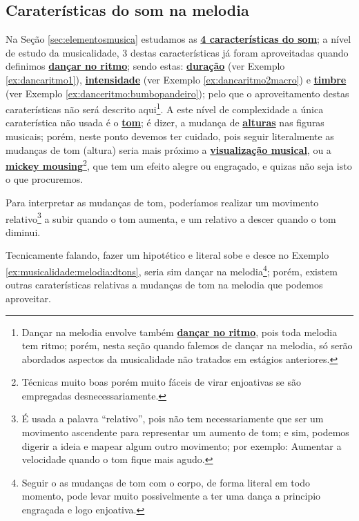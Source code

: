 \subsection{Caraterísticas do som na melodia} 
Na 
Seção \ref{sec:elementosmusica} estudamos as \hyperref[sec:carateristasom]{\textbf{4 características do som}};
a nível de estudo da musicalidade, 
3 destas características já foram aproveitadas quando definimos \hyperref[subsec:dancaritmo]{\textbf{dançar no ritmo}};
sendo estas: 
\hyperref[sec:pos:Duracion]{\textbf{duração}} (ver Exemplo \ref{ex:dancaritmo1}), 
\hyperref[sec:pos:Intensidade]{\textbf{intensidade}} (ver Exemplo \ref{ex:dancaritmo2macro}) e 
\hyperref[sec:pos:timbre]{\textbf{timbre}} (ver Exemplo \ref{ex:danceritmo:bumbopandeiro});
pelo que o aproveitamento destas caraterísticas não será descrito aqui\footnote{\label{footn:melodiatemritmo}Dançar 
na melodia envolve também \hyperref[subsec:dancaritmo]{\textbf{dançar no ritmo}}, 
pois toda melodia tem ritmo; 
porém, nesta seção quando falemos de dançar na melodia, 
só serão abordados aspectos da musicalidade não tratados em estágios anteriores.}.
A este nível de complexidade a única caraterística não usada é 
o \hyperref[sec:pos:Altura]{\textbf{tom}};
é dizer, a mudança de \hyperref[sec:pos:Altura]{\textbf{alturas}} nas figuras musicais;
porém, neste ponto devemos ter cuidado, 
pois seguir literalmente as mudanças de tom (altura)
seria mais próximo a \hyperref[subsubsec:musicvisualization]{\textbf{visualização musical}},
 ou a \hyperref[sec:mikeymousing]{\textbf{mickey mousing}}\footnote{Técnicas 
muito boas porém muito fáceis de virar enjoativas se são empregadas desnecessariamente.},
que tem um efeito alegre ou engraçado, e quizas não seja isto o que procuremos.


\begin{example} 
\label{ex:musicalidade:melodia:dtons}
Para interpretar as mudanças de tom, 
poderíamos realizar um movimento relativo\footnote{É usada a palavra ``relativo'',
pois não tem necessariamente que ser um movimento ascendente para representar um aumento de tom;
e sim, podemos digerir a ideia e mapear algum outro movimento; 
por exemplo: Aumentar a velocidade quando o tom fique mais agudo.} 
a subir quando o tom aumenta,
e um relativo a descer quando o tom diminui.
\end{example}

Tecnicamente falando, 
fazer um hipotético e literal sobe e desce no Exemplo \ref{ex:musicalidade:melodia:dtons}, 
seria sim dançar na melodia\footnote{Seguir o as mudanças de tom com o corpo, 
de forma literal em todo momento, 
pode levar muito possivelmente a ter uma dança a principio engraçada e logo enjoativa.};
porém, 
existem outras caraterísticas relativas a mudanças de tom na melodia que podemos aproveitar. 

